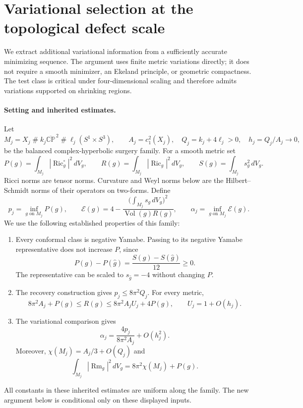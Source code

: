 
\section{Variational selection at the topological defect scale}
\label{sec:o11-variational-selection-20260929}

We extract additional variational information from a sufficiently accurate
minimizing sequence. The argument uses finite metric variations directly;
it does not require a smooth minimizer, an Ekeland principle, or geometric
compactness. The test class is critical under four-dimensional scaling and
therefore admits variations supported on shrinking regions.

\paragraph{Setting and inherited estimates.}
Let
\[
 M_j=X_j\mathbin{\#}k_j\overline{\mathbb{CP}}^{\,2}
       \mathbin{\#}\ell_j(S^1\times S^3),
 \qquad A_j=c_1^2(X_j),\quad Q_j=k_j+4\ell_j>0,
 \quad h_j=Q_j/A_j\longrightarrow0,
\]
be the balanced complex-hyperbolic surgery family. For a smooth metric set
\[
 P(g)=\int_{M_j}|\operatorname{Ric}^{\circ}_g|^2\,dV_g,
 \qquad R(g)=\int_{M_j}|\operatorname{Ric}_g|^2\,dV_g,
 \qquad S(g)=\int_{M_j}s_g^2\,dV_g.
\]
Ricci norms are tensor norms. Curvature and Weyl norms below are the
Hilbert--Schmidt norms of their operators on two-forms. Define
\[
 p_j=\inf_{g\text{ on }M_j}P(g),\qquad
 \mathcal E(g)=4-
 \frac{\bigl(\int_{M_j}s_g\,dV_g\bigr)^2}
      {\operatorname{Vol}(g)R(g)},\qquad
 \alpha_j=\inf_{g\text{ on }M_j}\mathcal E(g).
\]
We use the following established properties of this family:
\begin{enumerate}
\item Every conformal class is negative Yamabe. Passing to its negative
Yamabe representative does not increase $P$, since
\[
 P(g)-P(\widehat g)=\frac{S(g)-S(\widehat g)}{12}\ge0.
\]
The representative can be scaled to $s_{\widehat g}=-4$ without changing
$P$.
\item The recovery construction gives $p_j\le8\pi^2Q_j$. For every metric,
\[
 8\pi^2A_j+P(g)\le R(g)
 \le8\pi^2A_jU_j+4P(g),\qquad U_j=1+O(h_j).
\]
\item The variational comparison gives
\[
 \alpha_j=\frac{4p_j}{8\pi^2A_j}+O(h_j^2).
\]
Moreover, $\chi(M_j)=A_j/3+O(Q_j)$ and
\[
 \int_{M_j}|\operatorname{Rm}_g|^2\,dV_g
       =8\pi^2\chi(M_j)+P(g).
\]
\end{enumerate}
All constants in these inherited estimates are uniform along the family.
The new argument below is conditional only on these displayed inputs.


